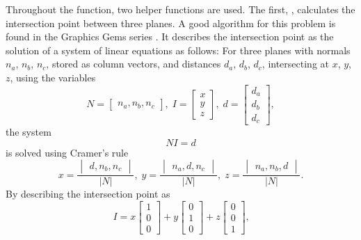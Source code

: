 Throughout the  function, two helper functions are used.
The first, , calculates the intersection point between three planes.
A good algorithm for this problem is found in the Graphics Gems series \cite[p304]{graphics_gems_1}.
It describes the intersection point as the solution of a system of linear equations as follows:
For three planes with normals $n_a$, $n_b$, $n_c$, stored as column vectors, and distances $d_a$, $d_b$, $d_c$, intersecting at $x$, $y$, $z$, using the variables
\begin{equation}
	N = \begin{bmatrix} n_a, n_b, n_c \end{bmatrix}, \;
	I = \begin{bmatrix} x \\ y \\ z \end{bmatrix}, \;
	d = \begin{bmatrix} d_a \\ d_b \\ d_c \end{bmatrix},
\end{equation}
the system
\begin{equation}
N I = d
\end{equation}
is solved using Cramer's rule
\begin{equation}
	x = \frac{\begin{vmatrix} d, n_b, n_c \end{vmatrix}}{|N|}, \;
	y = \frac{\begin{vmatrix} n_a, d, n_c \end{vmatrix}}{|N|}, \;
	z = \frac{\begin{vmatrix} n_a, n_b, d \end{vmatrix}}{|N|} \text{.}
\end{equation}
By describing the intersection point as
\begin{equation}
	I =
	x \begin{bmatrix} 1 \\ 0 \\ 0 \end{bmatrix} +
	y \begin{bmatrix} 0 \\ 1 \\ 0 \end{bmatrix} +
	z \begin{bmatrix} 0 \\ 0 \\ 1 \end{bmatrix} \text{,}
\end{equation}

